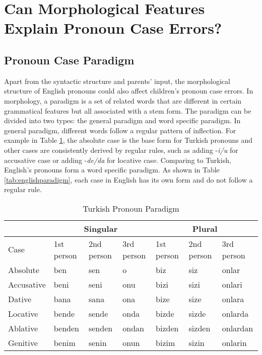 \section{Can Morphological Features Explain Pronoun Case Errors?}
\subsection{Pronoun Case Paradigm}
Apart from the syntactic structure and parents' input, the morphological structure of English pronouns could also affect children's pronoun case errors. In morphology, a paradigm is a set of related words that are different in certain grammatical features but all associated with a stem form. The paradigm can be divided into two types: the general paradigm and word specific paradigm. In general paradigm, different words follow a regular pattern of inflection. For example in Table \ref{tab:turkish}, the absolute case is the base form for Turkish pronouns and other cases are consistently derived by regular rules, such as adding -\textit{i/u} for accusative case or adding -\textit{de/da} for locative case. Comparing to Turkish, English's pronouns form a word specific paradigm. As shown in Table \ref{tab:englishparadigm}, each case in English has its own form and do not follow a regular rule. 


\FloatBarrier
\begin{table}[!h]
\centering
\caption{Turkish Pronoun Paradigm}
\label{tab:turkish}
\begin{tabular}{l|lll|lll}
\toprule
 & \multicolumn{3}{|c}{Singular} & \multicolumn{3}{|c}{Plural} \\
 \hline
Case & 1st person & 2nd person & 3rd person & 1st person & 2nd person & 3rd person \\
\hline
Absolute & ben & sen & o & biz & siz & onlar \\
Accusative & beni & seni & onu & bizi & sizi & onlari \\
Dative & bana & sana & ona & bize & size & onlara \\
Locative & bende & sende & onda & bizde & sizde & onlarda \\
Ablative & benden & senden & ondan & bizden & sizden & onlardan \\
Genitive & benim & senin & onun & bizim & sizin & onlarin\\
\bottomrule
\end{tabular}
\end{table}
\FloatBarrier

